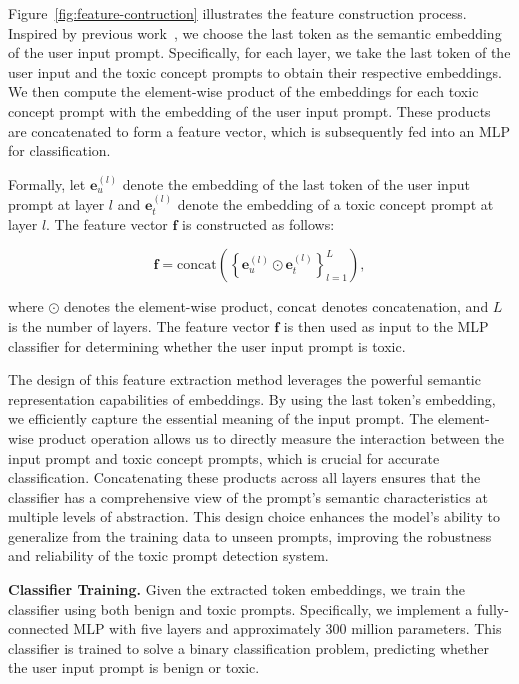 Figure~\ref{fig:feature-contruction} illustrates the feature construction process. Inspired by previous work~\cite{li2016understanding,zou2023representation}, we choose the last token as the semantic embedding of the user input prompt. Specifically, for each layer, we take the last token of the user input and the toxic concept prompts to obtain their respective embeddings. We then compute the element-wise product of the embeddings for each toxic concept prompt with the embedding of the user input prompt. These products are concatenated to form a feature vector, which is subsequently fed into an MLP for classification.

Formally, let $\mathbf{e}_{u}^{(l)}$ denote the embedding of the last token of the user input prompt at layer $l$ and $\mathbf{e}_{t}^{(l)}$ denote the embedding of a toxic concept prompt at layer $l$. The feature vector $\mathbf{f}$ is constructed as follows:

\begin{equation}
\mathbf{f} = \text{concat}\left( \left\{ \mathbf{e}_{u}^{(l)} \odot \mathbf{e}_{t}^{(l)} \right\}_{l=1}^{L} \right),
\end{equation}

where $\odot$ denotes the element-wise product, $\text{concat}$ denotes concatenation, and $L$ is the number of layers. The feature vector $\mathbf{f}$ is then used as input to the MLP classifier for determining whether the user input prompt is toxic.

The design of this feature extraction method leverages the powerful semantic representation capabilities of embeddings. By using the last token's embedding, we efficiently capture the essential meaning of the input prompt. The element-wise product operation allows us to directly measure the interaction between the input prompt and toxic concept prompts, which is crucial for accurate classification. Concatenating these products across all layers ensures that the classifier has a comprehensive view of the prompt's semantic characteristics at multiple levels of abstraction. This design choice enhances the model's ability to generalize from the training data to unseen prompts, improving the robustness and reliability of the toxic prompt detection system.


\textbf{Classifier Training.} Given the extracted token embeddings, we train the classifier using both benign and toxic prompts. Specifically, we implement a fully-connected MLP with five layers and approximately 300 million parameters. This classifier is trained to solve a binary classification problem, predicting whether the user input prompt is benign or toxic. 

